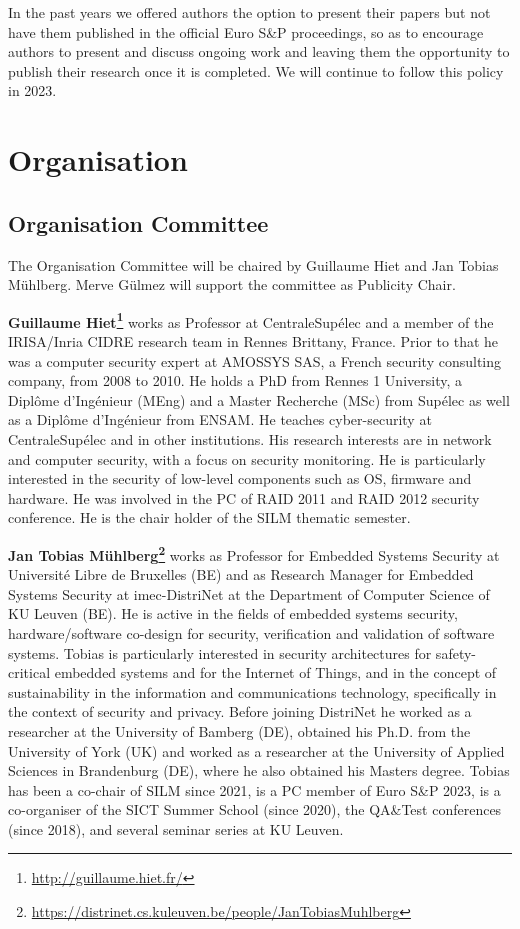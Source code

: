\documentclass[a4paper,11pt]{article}
\newcommand{\SILMYear}{2023}
\begin{document}
In the past years we offered authors the option to present their papers but
not have them published in the official Euro S\&P proceedings, so as to
encourage authors to present and discuss ongoing work and leaving them the
opportunity to publish their research once it is completed. We will continue to follow
this policy in \SILMYear{}.


\section{Organisation}
%
\subsection{Organisation Committee}
%
The Organisation Committee will be chaired by Guillaume Hiet and Jan Tobias
M\"uhlberg. Merve G\"ulmez will support the committee as Publicity Chair.

\textbf{Guillaume Hiet\footnote{\url{http://guillaume.hiet.fr/}}} works as
Professor at CentraleSupélec and a member of the IRISA/Inria CIDRE research
team in Rennes Brittany, France. Prior to that he was a computer security
expert at AMOSSYS SAS, a French security consulting company, from 2008 to
2010. He holds a PhD from Rennes 1 University, a Diplôme d'Ingénieur (MEng)
and a Master Recherche (MSc) from Supélec as well as a Diplôme d'Ingénieur
from ENSAM. He teaches cyber-security at CentraleSupélec and in other
institutions. His research interests are in network and computer security,
with a focus on security monitoring. He is particularly interested in the
security of low-level components such as OS, firmware and hardware. He was
involved in the PC of RAID 2011 and RAID 2012 security conference. He is
the chair holder of the SILM thematic semester.

\textbf{Jan Tobias
M\"uhlberg\footnote{\url{https://distrinet.cs.kuleuven.be/people/JanTobiasMuhlberg}}}
works as Professor for Embedded Systems Security at Universit\'e Libre de
Bruxelles (BE) and as Research Manager for Embedded Systems Security at
imec-DistriNet at the Department of Computer Science of KU Leuven (BE). He
is active in the fields of embedded systems security, hardware/software
co-design for security, verification and validation of software systems.
Tobias is particularly interested in security architectures for
safety-critical embedded systems and for the Internet of Things, and in the
concept of sustainability in the information and communications technology,
specifically in the context of security and privacy. Before joining
DistriNet he worked as a researcher at the University of Bamberg (DE),
obtained his Ph.D. from the University of York (UK) and worked as a
researcher at the University of Applied Sciences in Brandenburg (DE), where
he also obtained his Masters degree. Tobias has been a co-chair of SILM
since 2021, is a PC member of Euro S\&P 2023, is a co-organiser of the SICT
Summer School (since 2020), the QA\&Test conferences (since 2018), and
several seminar series at KU Leuven.
\end{document}
